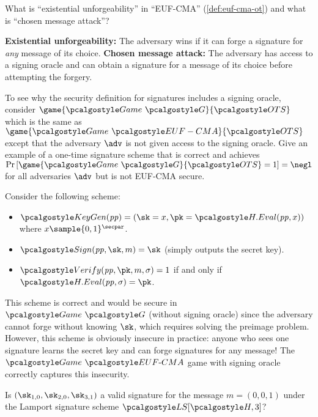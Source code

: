 \begin{exercise}
  What is ``existential unforgeability'' in ``EUF-CMA'' (\autoref{def:euf-cma-ot}) and what is ``chosen message attack''?
\end{exercise}

\ifsolutions
\begin{mysolution}
  \textbf{Existential unforgeability:} The adversary wins if it can forge a signature for \emph{any} message of its choice.
  \textbf{Chosen message attack:} The adversary has access to a signing oracle and can obtain a signature for a message of its choice before attempting the forgery.
\end{mysolution}
\fi

\begin{exercise}
  To see why the security definition for signatures includes a signing oracle, consider $\game{\Game~\algo{G}}{\algo{OTS}}$ which is the same as $\game{\Game~\algo{EUF-CMA}}{\algo{OTS}}$ except that the adversary $\adv$ is not given access to the signing oracle.
  Give an example of a one-time signature scheme that is correct and achieves $\pr{\game{\Game~\algo{G}}{\algo{OTS}} = 1} = \negl$ for all \ppt adversaries $\adv$ but is not EUF-CMA secure.
\end{exercise}

\ifsolutions
\begin{mysolution}
  Consider the following scheme:
  \begin{itemize}
      \item $\algo{KeyGen}(\params) = (\sk = x, \pk = \algo{H.Eval}(\params, x))$ where $x \sample \{0,1\}^\secpar$.
      \item $\algo{Sign}(\params, \sk, m) = \sk$ (simply outputs the secret key).
      \item $\algo{Verify}(\params, \pk, m, \sigma) = 1$ if and only if $\algo{H.Eval}(\params, \sigma) = \pk$.
  \end{itemize}
  This scheme is correct and would be secure in $\Game~\algo{G}$ (without signing oracle) since the adversary cannot forge without knowing $\sk$, which requires solving the preimage problem.
  However, this scheme is obviously insecure in practice: anyone who sees one signature learns the secret key and can forge signatures for any message!
  The $\Game~\algo{EUF\text{-}CMA}$ game with signing oracle correctly captures this insecurity.
\end{mysolution}
\fi

\begin{exercise}
  Is $(\sk_{1,0}, \sk_{2,0}, \sk_{3,1})$ a valid signature for the message $m = (0, 0, 1)$ under the Lamport signature scheme $\algo{LS}[\algo{H}, 3]$?
\end{exercise}

